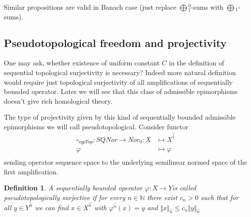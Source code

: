 \documentclass[12pt]{article}
\newtheorem{definition}[theorem]{Definition}
\begin{document}
Similar propositions are valid in Banach case 
(just replace $\bigoplus{}_1^0$-sums with $\bigoplus{}_1$-sums).







































\subsection{Pseudotopological freedom and projectivity}

One may ask, whether existence of uniform constant $C$ in the definition of 
sequential topological surjectivity is necessary? Indeed more natural 
definition would require just topological surjectivity of all amplifications 
of sequentially bounded operator. Later we will see that this class of 
admissible epimorphisms doesn't give rich homological theory. 

The type of projectivity given by this kind of sequentially bounded admissible 
epimorphisms we will call pseudotopological. Consider functor
$$
\begin{aligned}
\square_{sqpTop} : SQNor \to Nor_0: X &\mapsto X^{\wideparen{1}}\\
\varphi&\mapsto\varphi \\
\end{aligned}
$$
sending operator sequence space to the underlying semilinear normed space of 
the first amplification.

\begin{definition}\label{DefPsSQTopSurjOp} A sequentially bounded 
operator $\varphi:X\to Y$is called pseudotopologically surjective if for 
every $n\in\mathbb{N}$ there exist $c_n>0$ such that for 
all $y\in Y^{\wideparen{n}}$ we can find $x\in X^{\wideparen{n}}$ 
with $\varphi^{\wideparen{n}}(x)=y$ 
and $\Vert x\Vert_{\wideparen{n}}\leq c_n\Vert y\Vert_{\wideparen{n}}$ 
\end{definition}
\end{document}

